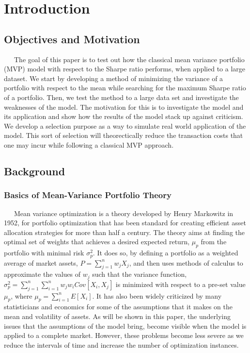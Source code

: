 \documentclass[12pt,titlepage,a4paper]{article}
\begin{document}
\section{Introduction}
	\subsection{Objectives and Motivation}
		\ \ \ The goal of this paper is to test out how the classical mean variance portfolio (MVP) model with respect to the Sharpe ratio performs, when applied to a large dataset. We start by developing a method of minimizing the variance of a portfolio with respect to the mean while searching for the maximum Sharpe ratio of a portfolio. Then, we test the method to a large data set and investigate the weaknesses of the model. The motivation for this is to investigate the model and its application and show how the results of the model stack up against criticism. We develop a selection purpose as a way to simulate real world application of the model. This sort of selection will theorectically reduce the transaction costs that one may incur while following a classical MVP approach. \\ 
	\subsection{Background}
		\subsubsection{Basics of Mean-Variance Portfolio Theory}
		\ \ \  Mean variance optimization is a theory developed by Henry Markowitz in 1952, for portfolio optimization that has been standard for creating efficient asset allocation strategies for more than half a century. The theory aims at finding the optimal set of weights that achieves a desired expected return, $\mu_p$ from the portfolio with minimal risk $\sigma^2_p$. It does so, by defining a portfolio as a weighted average of market assets, $P = \sum_{j=1}^n w_j X_j$, and then uses methods of calculus to approximate the values of $w_j$ such that the variance function, $\sigma_p^2 = \sum_{j=1}^n\sum_{i=1}^nw_jw_iCov[X_i,X_j]$ is minimized with respect to a pre-set value $\mu_p$, where $\mu_p=\sum_{i=1}^nE[X_i]$.  It has also been widely criticized by many statisticians and economics for some of the assumptions that it makes on the mean and volatility of assets. As will be shown in this paper, the underlying issues that the assumptions of the model bring, become visible when the model is applied to a complete market. However, these problems become less severe as we reduce the intervals of time and increase the number of optimization instances.\\
\end{document}
